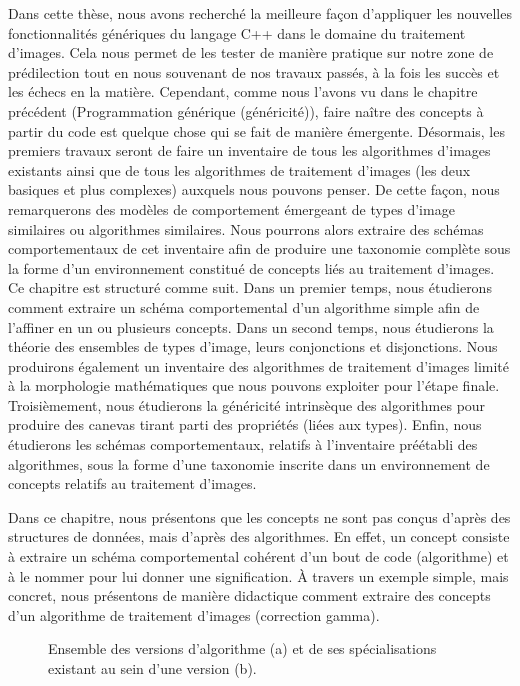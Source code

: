 Dans cette thèse, nous avons recherché la meilleure façon d'appliquer les nouvelles fonctionnalités génériques du
langage C++ dans le domaine du traitement d'images. Cela nous permet de les tester de manière pratique sur notre zone de
prédilection tout en nous souvenant de nos travaux passés, à la fois les succès et les échecs en la matière. Cependant,
comme nous l'avons vu dans le chapitre précédent (Programmation générique (généricité)), faire naître des concepts à
partir du code est quelque chose qui se fait de manière émergente. Désormais, les premiers travaux seront de faire un
inventaire de tous les algorithmes d'images existants ainsi que de tous les algorithmes de traitement d'images (les deux
basiques et plus complexes) auxquels nous pouvons penser. De cette façon, nous remarquerons des modèles de comportement
émergeant de types d'image similaires ou algorithmes similaires. Nous pourrons alors extraire des schémas
comportementaux de cet inventaire afin de produire une taxonomie complète sous la forme d'un environnement constitué de
concepts liés au traitement d'images. Ce chapitre est structuré comme suit. Dans un premier temps, nous étudierons
comment extraire un schéma comportemental d'un algorithme simple afin de l'affiner en un ou plusieurs concepts. Dans un
second temps, nous étudierons la théorie des ensembles de types d'image, leurs conjonctions et disjonctions. Nous
produirons également un inventaire des algorithmes de traitement d'images limité à la morphologie mathématiques que nous
pouvons exploiter pour l'étape finale. Troisièmement, nous étudierons la généricité intrinsèque des algorithmes pour
produire des canevas tirant parti des propriétés (liées aux types). Enfin, nous étudierons les schémas comportementaux,
relatifs à l'inventaire préétabli des algorithmes, sous la forme d'une taxonomie inscrite dans un environnement de
concepts relatifs au traitement d'images.

Dans ce chapitre, nous présentons que les concepts ne sont pas conçus d'après des structures de données, mais d'après
des algorithmes. En effet, un concept consiste à extraire un schéma comportemental cohérent d'un bout de code
(algorithme) et à le nommer pour lui donner une signification. \`{A} travers un exemple simple, mais concret, nous
présentons de manière didactique comment extraire des concepts d'un algorithme de traitement d'images (correction
gamma).

\begin{figure}[htbp]
  \centering
  \hfil
  \caption[]{Ensemble des versions d'algorithme (a) et de ses spécialisations existant au sein d'une version (b).}
  \label{resume:fig:image.version.vs.specialization}
\end{figure}

